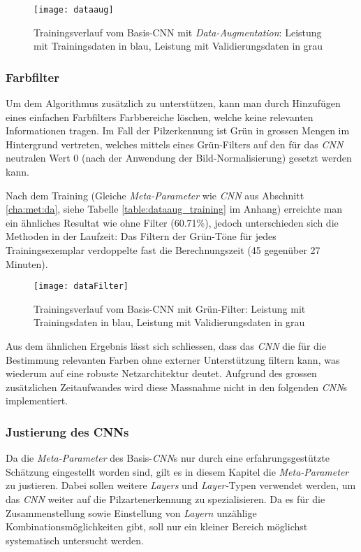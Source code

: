\begin{figure}[h]
	\centering
	\texttt{[image: dataaug]}
	\caption[Trainingsverlauf Basis-\textit{CNN} mit \textit{Data-Augmentation}]{Trainingsverlauf vom Basis-{CNN} mit \textit{Data-Augmentation}: Leistung mit Trainingsdaten in blau, Leistung mit Validierungsdaten in grau}
	\label{img:dataaug_cnn}
\end{figure}

\subsubsection{Farbfilter}
Um dem Algorithmus zusätzlich zu unterstützen, kann man durch Hinzufügen eines einfachen Farbfilters Farbbereiche löschen, welche keine relevanten Informationen tragen. Im Fall der Pilzerkennung ist Grün in grossen Mengen im Hintergrund vertreten, welches mittels eines Grün-Filters auf den für das \textit{CNN} neutralen Wert 0 (nach der Anwendung der Bild-Normalisierung) gesetzt werden kann.

Nach dem Training (Gleiche \textit{Meta-Parameter} wie \textit{CNN} aus Abschnitt \ref{cha:met:da}, siehe Tabelle \ref{table:dataaug_training} im Anhang) erreichte man ein ähnliches Resultat wie ohne Filter (60.71\%), jedoch unterschieden sich die Methoden in der Laufzeit: Das Filtern der Grün-Töne für jedes Trainingsexemplar verdoppelte fast die Berechnungszeit (45 gegenüber 27 Minuten).

\begin{figure}[h]
	\centering
	\texttt{[image: dataFilter]}
	\caption[Trainingsverlauf Basis-\textit{CNN} mit Grün-Filter]{Trainingsverlauf vom Basis-{CNN} mit Grün-Filter: Leistung mit Trainingsdaten in blau, Leistung mit Validierungsdaten in grau}
	\label{img:gf_cnn}
\end{figure}

Aus dem ähnlichen Ergebnis lässt sich schliessen, dass das \textit{CNN} die für die Bestimmung relevanten Farben ohne externer Unterstützung filtern kann, was wiederum auf eine robuste Netzarchitektur deutet. Aufgrund des grossen zusätzlichen Zeitaufwandes wird diese Massnahme nicht in den folgenden \textit{CNN}s implementiert.

\subsubsection{Justierung des CNNs}
Da die \textit{Meta-Parameter} des Basis-\textit{CNN}s nur durch eine erfahrungsgestützte Schätzung eingestellt worden sind, gilt es in diesem Kapitel die \textit{Meta-Parameter} zu justieren. Dabei sollen weitere \textit{Layers} und \textit{Layer-}Typen verwendet werden, um das \textit{CNN} weiter auf die Pilzartenerkennung zu spezialisieren. Da es für die Zusammenstellung sowie Einstellung von \textit{Layern} unzählige Kombinationsmöglichkeiten gibt, soll nur ein kleiner Bereich möglichst systematisch untersucht werden.

